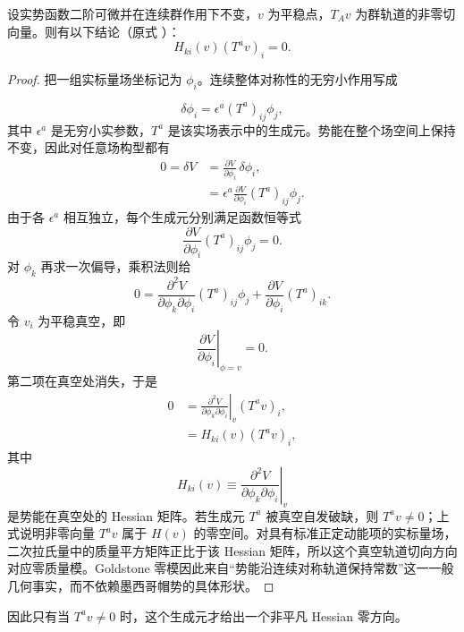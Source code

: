 \begin{proposition}
设实势函数二阶可微并在连续群作用下不变，$v$ 为平稳点，$T_Av$ 为群轨道的非零切向量。则有以下结论（原式 ）：
\begin{equation*}
\boxed{
H_{ki}(v)(T^av)_i=0.}
\end{equation*}
\end{proposition}
\begin{proof}
把一组实标量场坐标记为 $\phi_i$。连续整体对称性的无穷小作用写成

\begin{equation*}
 \delta\phi_i=\epsilon^a(T^a)_{ij}\phi_j,
\end{equation*}
其中 $\epsilon^a$ 是无穷小实参数，$T^a$ 是该实场表示中的生成元。势能在整个场空间上保持不变，因此对任意场构型都有
\begin{align*}
 0=\delta V
 &=\frac{\partial V}{\partial\phi_i}\,\delta\phi_i,\\
 &=\epsilon^a\frac{\partial V}{\partial\phi_i}(T^a)_{ij}\phi_j.
\end{align*}
由于各 $\epsilon^a$ 相互独立，每个生成元分别满足函数恒等式
\begin{equation*}
 \frac{\partial V}{\partial\phi_i}(T^a)_{ij}\phi_j=0.
\end{equation*}
对 $\phi_k$ 再求一次偏导，乘积法则给
\begin{equation*}
 0=
 \frac{\partial^2V}{\partial\phi_k\partial\phi_i}
 (T^a)_{ij}\phi_j
 +\frac{\partial V}{\partial\phi_i}(T^a)_{ik}.
\end{equation*}
令 $v_i$ 为平稳真空，即
\begin{equation*}
 \left.\frac{\partial V}{\partial\phi_i}\right|_{\phi=v}=0.
\end{equation*}
第二项在真空处消失，于是
\begin{align*}
 0
 &=\left.\frac{\partial^2V}{\partial\phi_k\partial\phi_i}
 \right|_{v}(T^av)_i,\\
 &=H_{ki}(v)(T^av)_i,
\end{align*}
其中
\begin{equation*}
 H_{ki}(v)\equiv
 \left.\frac{\partial^2V}{\partial\phi_k\partial\phi_i}\right|_v
\end{equation*}
是势能在真空处的 Hessian 矩阵。若生成元 $T^a$ 被真空自发破缺，则 $T^av\neq0$；上式说明非零向量 $T^av$ 属于 $H(v)$ 的零空间。对具有标准正定动能项的实标量场，二次拉氏量中的质量平方矩阵正比于该 Hessian 矩阵，所以这个真空轨道切向方向对应零质量模。Goldstone 零模因此来自“势能沿连续对称轨道保持常数”这一一般几何事实，而不依赖墨西哥帽势的具体形状。
\end{proof}

因此只有当 \(T^av\neq0\) 时，这个生成元才给出一个非平凡 Hessian 零方向。




